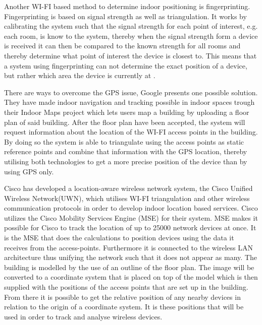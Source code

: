 Another WI-FI based method to determine indoor positioning is fingerprinting. Fingerprinting is based on signal strength as well as triangulation. It works by calibrating the system such that the signal strength for each point of interest, e.g. each room, is know to the system, thereby when the signal strength form a device is received it can then be compared to the known strength for all rooms and thereby determine what point of interest the device is closest to. This means that a system using fingerprinting can not determine the exact position of a device, but rather which area the device is currently at \cite{fingerprint1}.

There are ways to overcome the GPS issue, Google presents one possible solution. They have made indoor navigation and tracking possible in indoor spaces trough their Indoor Maps project \cite{IPSoverGPS} which lets users map a building by uploading a floor plan of said building. After the floor plan have been accepted, the system will request information about the location of the WI-FI access points in the building. By doing so the system is able to triangulate using the access points as static reference points and combine that information with the GPS location, thereby utilising both technologies to get a more precise position of the device than by using GPS only.

Cisco has developed a location-aware wireless network system, the Cisco Unified Wireless Network(UWN), which utilises WI-FI triangulation\cite{CiscoTri} and other wireless communication protocols in order to develop indoor location based services\cite{uwn}.
Cisco utilizes the Cisco Mobility Services Engine (MSE) for their system. MSE makes it possible for Cisco to track the location of up to 25000 network devices at once. It is the MSE that does the calculations to position devices using the data it receives from the access-points. Furthermore it is connected to the wireless LAN architecture thus unifying the network such that it does not appear as many\cite{ciscoMSE}.
The building is modelled by the use of an outline of the floor plan. The image will be converted to a coordinate system that is placed on top of the model which is then supplied with the positions of the access points that are set up in the building. From there it is possible to get the relative position of any nearby devices in relation to the origin of a coordinate system. It is these positions that will be used in order to track and analyse wireless devices.

